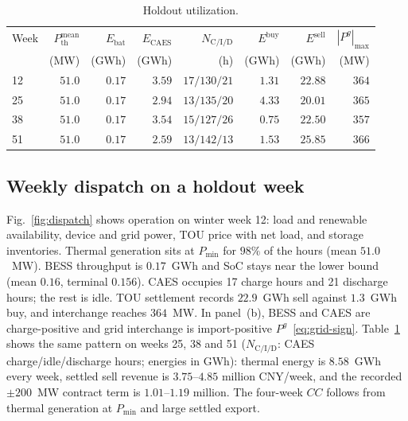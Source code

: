 \documentclass[conference]{IEEEtran}
\begin{document}
\begin{table}[!t]
\caption{Holdout utilization.}
\label{tab:util}
\centering
\scriptsize
\setlength{\tabcolsep}{2.6pt}
\begin{tabular}{@{}lrrrrrrr@{}}
\toprule
Week & \(P_{\mathrm{th}}^{\mathrm{mean}}\) & \(E_{\mathrm{bat}}\) & \(E_{\mathrm{CAES}}\) & \(N_{\mathrm{C/I/D}}\) & \(E^{\mathrm{buy}}\) & \(E^{\mathrm{sell}}\) & \(|P^{g}|_{\max}\) \\
 & (MW) & (GWh) & (GWh) & (h) & (GWh) & (GWh) & (MW) \\
\midrule
12 & \(51.0\) & \(0.17\) & \(3.59\) & \(17/130/21\) & \(1.31\) & \(22.88\) & \(364\) \\
25 & \(51.0\) & \(0.17\) & \(2.94\) & \(13/135/20\) & \(4.33\) & \(20.01\) & \(365\) \\
38 & \(51.0\) & \(0.17\) & \(3.54\) & \(15/127/26\) & \(0.75\) & \(22.50\) & \(357\) \\
51 & \(51.0\) & \(0.17\) & \(2.59\) & \(13/142/13\) & \(1.53\) & \(25.85\) & \(366\) \\
\bottomrule
\end{tabular}
\end{table}

\subsection{Weekly dispatch on a holdout week}
\label{sec:dispatch}

Fig.~\ref{fig:dispatch} shows operation on winter week 12: load and renewable availability, device and grid power, TOU price with net load, and storage inventories. Thermal generation sits at \(P_{\min}\) for \(98\%\) of the hours (mean \(51.0\)~MW). BESS throughput is \(0.17\)~GWh and SoC stays near the lower bound (mean \(0.16\), terminal \(0.156\)). CAES occupies 17 charge hours and 21 discharge hours; the rest is idle. TOU settlement records \(22.9\)~GWh sell against \(1.3\)~GWh buy, and interchange reaches \(364\)~MW. In panel~(b), BESS and CAES are charge-positive and grid interchange is import-positive \(P^{g}\)~\eqref{eq:grid-sign}. Table~\ref{tab:util} shows the same pattern on weeks 25, 38 and 51 (\(N_{\mathrm{C/I/D}}\): CAES charge/idle/discharge hours; energies in GWh): thermal energy is \(8.58\)~GWh every week, settled sell revenue is \(3.75\)--\(4.85\) million CNY/week, and the recorded \(\pm200\)~MW contract term is \(1.01\)--\(1.19\) million. The four-week \(CC\) follows from thermal generation at \(P_{\min}\) and large settled export.
\end{document}
